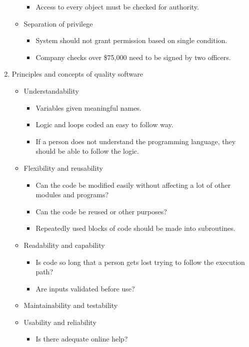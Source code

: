 \documentclass[a4paper]{article}
\begin{document}
\begin{enumerate}
\begin{itemize}
\begin{itemize}
						\item Access to every object must be checked for authority.
					\end{itemize}
				\item Separation of privilege
					\begin{itemize}
						\item System should not grant permission based on single
							condition.
						\item Company checks over \$75,000 need to be signed
							by two officers.
					\end{itemize}
			\end{itemize}
		\item Principles and concepts of quality software
			\begin{itemize}
				\item Understandability
					\begin{itemize}
						\item Variables given meaningful names.
						\item Logic and loops coded an easy to follow way.
						\item If a person does not understand the programming
							language, they should be able to follow the logic.
					\end{itemize}
				\item Flexibility and reusability
					\begin{itemize}
						\item Can the code be modified easily without affecting
							a lot of other modules and programs?
						\item Can the code be reused or other purposes?
						\item Repeatedly used blocks of code should be made into
							subroutines.
					\end{itemize}
				\item Readability and capability
					\begin{itemize}
						\item Is code so long that a person gets lost trying to
							follow the execution path?
						\item Are inputs validated before use?
					\end{itemize}
				\item Maintainability and testability
				\item Usability and reliability
					\begin{itemize}
						\item Is there adequate online help?

\end{itemize}
\end{itemize}
\end{enumerate}
\end{document}
